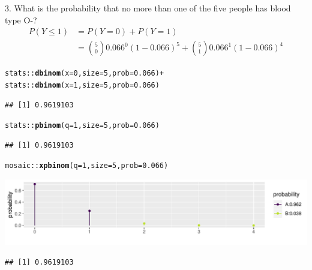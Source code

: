 \documentclass{beamer}\usepackage[]{graphicx}\usepackage[]{color}
\newcommand{\hlnum}[1]{\textcolor[rgb]{0.686,0.059,0.569}{#1}}%
\newcommand{\hlopt}[1]{\textcolor[rgb]{0,0,0}{#1}}%
\newcommand{\hlstd}[1]{\textcolor[rgb]{0.345,0.345,0.345}{#1}}%
\newcommand{\hlkwc}[1]{\textcolor[rgb]{0.333,0.667,0.333}{#1}}%
\newcommand{\hlkwd}[1]{\textcolor[rgb]{0.737,0.353,0.396}{\textbf{#1}}}%
\newenvironment{knitrout}{}{} %
\begin{document}
\begin{frame}[fragile]{3. What is the probability that no more than one of the five people has blood type O-?}
\footnotesize
\begin{align*}
P(Y \leq 1) & = P(Y = 0) + P(Y = 1) \\
& = \binom{5}{0} 0.066^0 (1- 0.066)^5 + \binom{5}{1} 0.066^1 (1- 0.066)^4
\end{align*}


\begin{knitrout}\scriptsize
{}\color{fgcolor}
\begin{alltt}
\hlstd{stats}\hlopt{::}\hlkwd{dbinom}\hlstd{(}\hlkwc{x} \hlstd{=} \hlnum{0}\hlstd{,} \hlkwc{size} \hlstd{=} \hlnum{5}\hlstd{,} \hlkwc{prob} \hlstd{=} \hlnum{0.066}\hlstd{)} \hlopt{+}
        \hlstd{stats}\hlopt{::}\hlkwd{dbinom}\hlstd{(}\hlkwc{x} \hlstd{=} \hlnum{1}\hlstd{,} \hlkwc{size} \hlstd{=} \hlnum{5}\hlstd{,} \hlkwc{prob} \hlstd{=} \hlnum{0.066}\hlstd{)}
\end{alltt}
\begin{verbatim}
## [1] 0.9619103
\end{verbatim}
\begin{alltt}
\hlstd{stats}\hlopt{::}\hlkwd{pbinom}\hlstd{(}\hlkwc{q} \hlstd{=} \hlnum{1}\hlstd{,} \hlkwc{size} \hlstd{=} \hlnum{5}\hlstd{,} \hlkwc{prob} \hlstd{=} \hlnum{0.066}\hlstd{)}
\end{alltt}
\begin{verbatim}
## [1] 0.9619103
\end{verbatim}
\begin{alltt}
\hlstd{mosaic}\hlopt{::}\hlkwd{xpbinom}\hlstd{(}\hlkwc{q} \hlstd{=} \hlnum{1}\hlstd{,} \hlkwc{size} \hlstd{=} \hlnum{5}\hlstd{,} \hlkwc{prob} \hlstd{=} \hlnum{0.066}\hlstd{)}
\end{alltt}


{\centering \includegraphics[width=1\linewidth]{figure/unnamed-chunk-10-1} 

}


\begin{verbatim}
## [1] 0.9619103
\end{verbatim}

\end{knitrout}

\end{frame}
\end{document}
